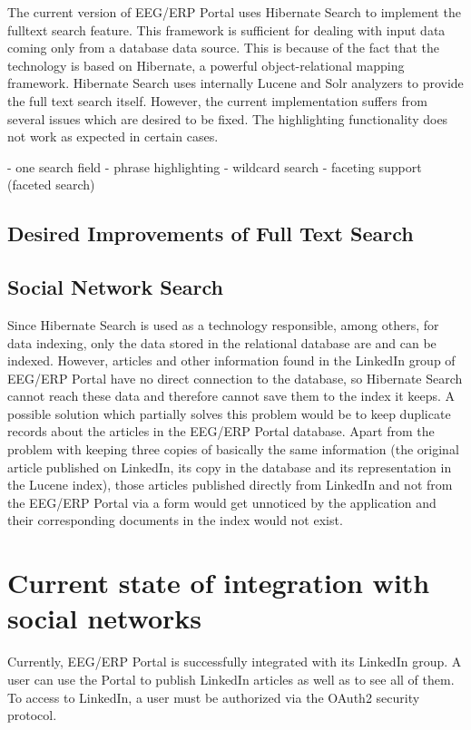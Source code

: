 \documentclass[12pt, oneside, a4paper]{book}
\begin{document}
The current version of EEG/ERP Portal uses Hibernate Search to implement the fulltext search feature. 
This framework is sufficient for dealing with input data coming only from a database data source. 
This is because of the fact that the technology is based on Hibernate, a powerful object-relational mapping framework. Hibernate Search uses internally Lucene and Solr analyzers to provide the full text search itself.
However, the current implementation suffers from several issues which are desired to be fixed. 
The highlighting functionality does not work as expected in certain cases. 

- one search field
- phrase highlighting
- wildcard search
- faceting support (faceted search)

\subsection{Desired Improvements of Full Text Search}


\subsection{Social Network Search}
Since Hibernate Search is used as a technology responsible, among others, for data indexing, only the data stored in the relational database are and can be indexed. 
However, articles and other information found in the LinkedIn group of EEG/ERP Portal have no direct connection to the database, so Hibernate Search cannot reach these data and therefore cannot save them to the index it keeps. 
A possible solution which partially solves this problem would be to keep duplicate records about the articles in the EEG/ERP Portal database. 
Apart from the problem with keeping three copies of basically the same information (the original article published on LinkedIn, its copy in the database and its representation in the Lucene index), those articles published directly from LinkedIn and not from the EEG/ERP Portal via a form would get unnoticed by the application and their corresponding documents in the index would not exist.


\section{Current state of integration with social networks}

Currently, EEG/ERP Portal is successfully integrated with its LinkedIn group. 
A user can use the Portal to publish LinkedIn articles as well as to see all of them. 
To access to LinkedIn, a user must be authorized via the OAuth2 security protocol.
\end{document}
